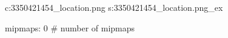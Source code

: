 c:3350421454\textures\hexer_location.png
s:3350421454\textures\hexer_location.png_ex

mipmaps: 0  # number of mipmaps
